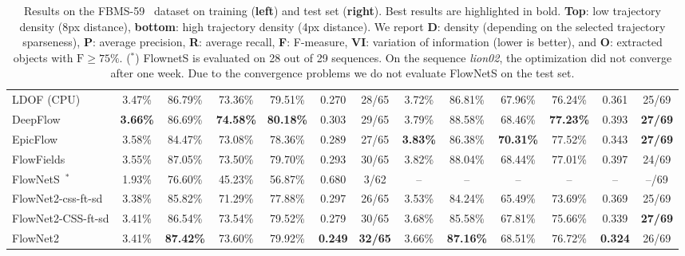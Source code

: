 \documentclass[10pt,twocolumn,letterpaper]{article}%
\newcommand{\pz}{\phantom{0}}%
\begin{document}
\begin{table}[tb]
\begin{center}
{\begin{tabular}{|l||cccccc|cccccc|}
    \hline
    
    {LDOF (CPU) \cite{ldof}} &{3.47\%} & {86.79\%} & {73.36\%}&  {79.51\%} &{0.270}& {28/65} & {3.72\%} &{86.81\%} & {67.96\%} & {76.24\%}  & {0.361}&{25/69} \\
    {DeepFlow \cite{deepflow}} &{\textbf{3.66\%}} & {86.69\%} & {\textbf{74.58\%}} & {\bf 80.18\%} & {0.303}& {29/65} & {3.79\%} &{88.58\%} & {68.46\%} & {\bf 77.23\%}& {0.393}  & \textbf{27/69} \\
    {EpicFlow \cite{epicflow}} &{3.58\%} & {84.47\%} & {73.08\%}&  {78.36\%} & {0.289}& {27/65} & \textbf{3.83\%} &{86.38\%} & \textbf{70.31\%} & {77.52\%} & {0.343} & \textbf{27/69} \\
    {FlowFields \cite{flowfields}} &{3.55\%} & {87.05\%} & {73.50\%}  &{79.70\%} & {0.293}& {30/65} & {3.82\%} &{88.04\%} & {68.44\%} & {77.01\%}& {0.397}  & {24/69} \\
    {FlowNetS~\cite{DFIB15}}$^*$ &{1.93\%}&{76.60\%} & {45.23\%} & {56.87\%}& {0.680}  & {\pz3/62} &{--}&{--} & {--} & {--}& {--}  & {\pz--/69}\\
    {FlowNet2-css-ft-sd} &{3.38\%} & {85.82\%} & {71.29\%}  & {77.88\%}& {0.297} & {26/65} & {3.53\%} &{84.24\%} & {65.49\%} & {73.69\%} & {0.369} & {25/69}\\
    {FlowNet2-CSS-ft-sd} &{3.41\%} & {86.54\%} & {73.54\%}  & {79.52\%}& {0.279} & {30/65} & {3.68\%} &{85.58\%} & {67.81\%} & {75.66\%} & {0.339} & \textbf{27/69}\\
    \rowcolor{gray!15}
    {FlowNet2} &{3.41\%} & {\textbf{87.42\%}} & {73.60\%}  & {79.92\%}& {\bf 0.249} & \textbf{32/65} & {3.66\%} &{\textbf{87.16\%}} & {68.51\%} & {76.72\%} & {\bf 0.324} & {26/69} \\
    \hline%
  \end{tabular}%
  }
  \end{center}%
  \caption{\label{tab:results_motion_seg} Results on the FBMS-59~\cite{Bro10c,Ochs14} dataset on training (\textbf{left}) and test set (\textbf{right}). Best results are highlighted in bold.
  \textbf{Top}: low trajectory density (8px distance), \textbf{bottom}: high trajectory density (4px distance).
  We report \textbf{D}: density (depending on the selected trajectory sparseness), \textbf{P}: average precision, \textbf{R}: average recall, \textbf{F}: F-measure, \textbf{VI}: variation of information (lower is better), and \textbf{O}: extracted objects with $\text{F}\geq 75\%$. ($^*$) FlownetS is evaluated on 28 out of 29 sequences. On the sequence \emph{lion02}, the optimization did not converge after one week. Due to the convergence problems we do not evaluate FlowNetS on the test set.}
\end{table}
\end{document}

